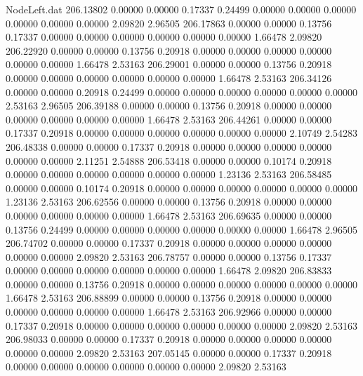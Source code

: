 \begin{filecontents}{NodeLeft.dat}
 206.13802    0.00000    0.00000     0.17337    0.24499    0.00000    0.00000    0.00000    0.00000    0.00000    0.00000    2.09820    2.96505
 206.17863    0.00000    0.00000     0.13756    0.17337    0.00000    0.00000    0.00000    0.00000    0.00000    0.00000    1.66478    2.09820
 206.22920    0.00000    0.00000     0.13756    0.20918    0.00000    0.00000    0.00000    0.00000    0.00000    0.00000    1.66478    2.53163
 206.29001    0.00000    0.00000     0.13756    0.20918    0.00000    0.00000    0.00000    0.00000    0.00000    0.00000    1.66478    2.53163
 206.34126    0.00000    0.00000     0.20918    0.24499    0.00000    0.00000    0.00000    0.00000    0.00000    0.00000    2.53163    2.96505
 206.39188    0.00000    0.00000     0.13756    0.20918    0.00000    0.00000    0.00000    0.00000    0.00000    0.00000    1.66478    2.53163
 206.44261    0.00000    0.00000     0.17337    0.20918    0.00000    0.00000    0.00000    0.00000    0.00000    0.00000    2.10749    2.54283
 206.48338    0.00000    0.00000     0.17337    0.20918    0.00000    0.00000    0.00000    0.00000    0.00000    0.00000    2.11251    2.54888
 206.53418    0.00000    0.00000     0.10174    0.20918    0.00000    0.00000    0.00000    0.00000    0.00000    0.00000    1.23136    2.53163
 206.58485    0.00000    0.00000     0.10174    0.20918    0.00000    0.00000    0.00000    0.00000    0.00000    0.00000    1.23136    2.53163
 206.62556    0.00000    0.00000     0.13756    0.20918    0.00000    0.00000    0.00000    0.00000    0.00000    0.00000    1.66478    2.53163
 206.69635    0.00000    0.00000     0.13756    0.24499    0.00000    0.00000    0.00000    0.00000    0.00000    0.00000    1.66478    2.96505
 206.74702    0.00000    0.00000     0.17337    0.20918    0.00000    0.00000    0.00000    0.00000    0.00000    0.00000    2.09820    2.53163
 206.78757    0.00000    0.00000     0.13756    0.17337    0.00000    0.00000    0.00000    0.00000    0.00000    0.00000    1.66478    2.09820
 206.83833    0.00000    0.00000     0.13756    0.20918    0.00000    0.00000    0.00000    0.00000    0.00000    0.00000    1.66478    2.53163
 206.88899    0.00000    0.00000     0.13756    0.20918    0.00000    0.00000    0.00000    0.00000    0.00000    0.00000    1.66478    2.53163
 206.92966    0.00000    0.00000     0.17337    0.20918    0.00000    0.00000    0.00000    0.00000    0.00000    0.00000    2.09820    2.53163
 206.98033    0.00000    0.00000     0.17337    0.20918    0.00000    0.00000    0.00000    0.00000    0.00000    0.00000    2.09820    2.53163
 207.05145    0.00000    0.00000     0.17337    0.20918    0.00000    0.00000    0.00000    0.00000    0.00000    0.00000    2.09820    2.53163

\end{filecontents}
